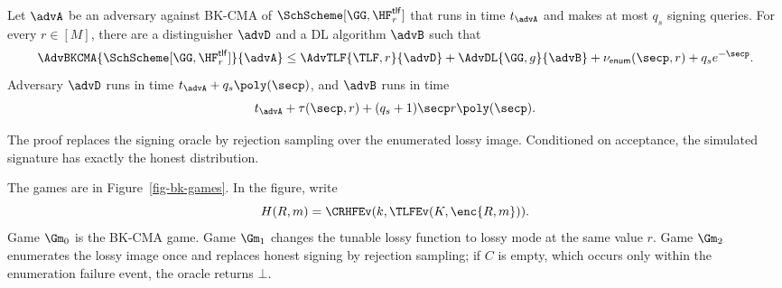 \begin{theorem} \label{thm-bk}
Let $\advA$ be an adversary against BK-CMA of $\SchScheme[\GG,\HF^{\mathsf{tlf}}_r]$ that runs in time $t_{\advA}$ and makes at most $q_s$ signing queries. For every $r\in[M]$, there are a distinguisher $\advD$ and a DL algorithm $\advB$ such that
$$
\AdvBKCMA{\SchScheme[\GG,\HF^{\mathsf{tlf}}_r]}{\advA}
\le
\AdvTLF{\TLF,r}{\advD}
+\AdvDL{\GG,g}{\advB}
+\nu_{\mathsf{enum}}(\secp,r)
+q_s e^{-\secp}.
$$
Adversary $\advD$ runs in time $t_{\advA}+q_s\poly(\secp)$, and $\advB$ runs in time
$$
t_{\advA}+\tau(\secp,r)+(q_s+1)\secp r\poly(\secp).
$$
\end{theorem}

The proof replaces the signing oracle by rejection sampling over the enumerated lossy image. Conditioned on acceptance, the simulated signature has exactly the honest distribution.

The games are in Figure~\ref{fig-bk-games}. In the figure, write
$$
H(R,m)=\CRHFEv(k,\TLFEv(K,\enc{R,m})).
$$
Game $\Gm_0$ is the BK-CMA game. Game $\Gm_1$ changes the tunable lossy function to lossy mode at the same value $r$. Game $\Gm_2$ enumerates the lossy image once and replaces honest signing by rejection sampling; if $C$ is empty, which occurs only within the enumeration failure event, the oracle returns $\bot$.

